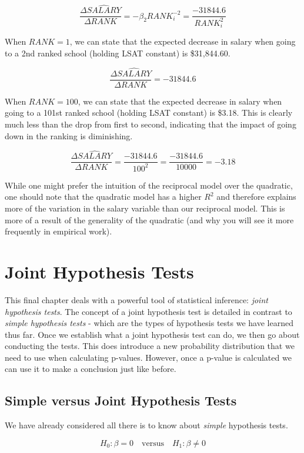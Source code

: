 \documentclass[
]{book}
\begin{document}
\[\frac{\Delta \widehat{SALARY}}{\Delta RANK} = -\beta_2 RANK_i^{-2}=\frac{-31844.6} {RANK_i^{2}}\]

When \(RANK = 1\), we can state that the expected decrease in salary when going to a 2nd ranked school (holding LSAT constant) is \$31,844.60.

\[\frac{\Delta \widehat{SALARY}}{\Delta RANK} = -31844.6\]

When \(RANK = 100\), we can state that the expected decrease in salary when going to a 101st ranked school (holding LSAT constant) is \$3.18. This is clearly much less than the drop from first to second, indicating that the impact of going down in the ranking is diminishing.

\[\frac{\Delta \widehat{SALARY}}{\Delta RANK} =\frac{-31844.6} {100^{2}}=\frac{-31844.6} {10000} = -3.18\]

While one might prefer the intuition of the reciprocal model over the quadratic, one should note that the quadratic model has a higher \(R^2\) and therefore explains more of the variation in the salary variable than our reciprocal model. This is more of a result of the generality of the quadratic (and why you will see it more frequently in empirical work).

\chapter{Joint Hypothesis Tests}\label{JHT}

This final chapter deals with a powerful tool of statistical inference: \emph{joint hypothesis tests}. The concept of a joint hypothesis test is detailed in contrast to \emph{simple hypothesis tests} - which are the types of hypothesis tests we have learned thus far. Once we establish what a joint hypothesis test can do, we then go about conducting the tests. This does introduce a new probability distribution that we need to use when calculating p-values. However, once a p-value is calculated we can use it to make a conclusion just like before.

\section{Simple versus Joint Hypothesis Tests}\label{simple-versus-joint-hypothesis-tests}

We have already considered all there is to know about \emph{simple} hypothesis tests.

\[H_0: \beta = 0 \quad \text{versus} \quad H_1: \beta \neq 0\]
\end{document}
